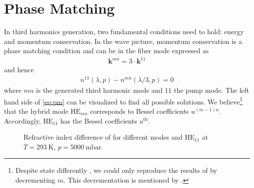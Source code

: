 \documentclass[fleqn, 10pt, twocolumn]{SelfArx}
\begin{document}
    \section{Phase Matching}
    In third harmonics generation, two fundamental conditions need to hold: energy and momentum conservation. 
    In the wave picture, momentum conservation is a phase matching condition and can be in the fiber mode expressed as
    \begin{align}
        \mathbf{k}^{mn} = 3 \cdot \mathbf k^{11} 
    \end{align}
    and hence
    \begin{align}
        n^{11}(\lambda, p) - n^{mn}(\lambda / 3, p)= 0
        \label{eq:pm}
    \end{align}
    where $mn$ is the generated third harmonic mode and $11$ the pump mode. 
    The left hand side of \eqref{eq:pm} can be visualized to find all possible solutions. 
    We believe\footnote{Despite \citeauthor{Travers2011} state differently \cite{Travers2011}, we could only reproduce the results of \citeauthor{Nold2010} by decrementing $m$. This decrementation is mentioned by \citeauthor{Marcatili1964} \cite{Marcatili1964}.} that the hybrid mode $\text{HE}_{mn}$ corresponds to Bessel coefficients $u^{(m-1)n}$. 
    Accordingly, $\text{HE}_{11}$ has the Bessel coefficients $u^{01}$.
    \begin{figure}[h]
        \centering
        \caption{Refractive index difference of  for different  modes and $\text{HE}_{11}$ at $T=\SI{293}{\kelvin}$, $p=\SI{5000}{\milli\bar}$.}
        \label{plt:pm}
    \end{figure}
\end{document}
